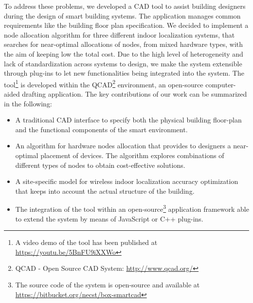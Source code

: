 To address these problems, we developed a CAD tool to assist building designers during the design of smart building systems.
The application manages common requirements like the building floor plan specification. We decided to implement a node allocation algorithm for three different indoor localization systems, that searches for  near-optimal 
allocations of nodes, from mixed hardware types, with the aim of keeping low the total cost. Due to the high level of heterogeneity and lack of standardization across systems to design, we make the system extensible through plug-ins to let new functionalities being integrated into the system.
The tool\footnote{A video demo of the tool has been published at \url{https://youtu.be/5BnFU9iXXWo}}
is developed within the QCAD\footnote{QCAD - Open Source CAD System: \url{http://www.qcad.org/}} environment, an \mbox{open-source} computer-aided drafting application. The key contributions of our work can be summarized in the following:
\begin{itemize}
\item A traditional CAD interface to specify both the physical building floor-plan and the functional components of the smart environment.
\item An algorithm for hardware nodes allocation that provides to designers a near-optimal placement of devices. The algorithm explores combinations of different types of nodes to obtain cost-effective solutions.
\item A site-specific model for wireless indoor localization accuracy optimization that keeps into account the actual structure of the building.
\item The integration of the tool within an \mbox{open-source}\footnote{The source code of the system is \mbox{open-source} and available at \url{https://bitbucket.org/necst/box-smartcad}} application framework able to extend the system by means of JavaScript or C++ plug-ins.
\end{itemize}

